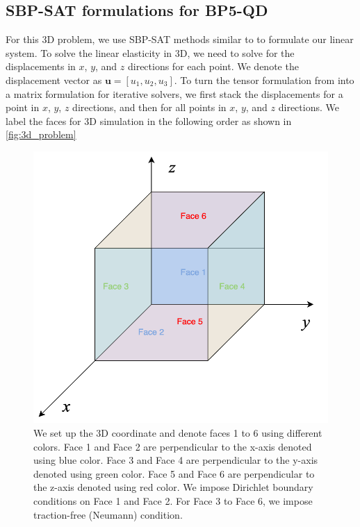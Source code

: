 \subsection{SBP-SAT formulations for BP5-QD}
For this 3D problem, we use SBP-SAT methods similar to \cite{ALMQUIST2021109842} to formulate our linear system.
To solve the linear elasticity in 3D, we need to solve for the displacements in $x$, $y$, and $z$ directions for each point.
We denote the displacement vector as $\boldsymbol{u} = [u_1, u_2, u_3]$.
To turn the tensor formulation from \cite{ALMQUIST2021109842} into a matrix formulation for iterative solvers,  we first stack the displacements for a point in $x$, $y$, $z$ directions, and then for all points in $x$, $y$, and $z$ directions.
We label the faces for 3D simulation in the following order as shown in \autoref{fig:3d_problem}

\begin{figure}
    \centering
    \includegraphics[width=\linewidth]{figures/3D_problem.png}
    \caption{We set up the 3D coordinate and denote faces 1 to 6 using different colors. Face 1 and Face 2 are perpendicular to the x-axis denoted using blue color. Face 3 and Face 4 are perpendicular to the y-axis denoted using green color. Face 5 and Face 6 are perpendicular to the z-axis denoted using red color. We impose Dirichlet boundary conditions on Face 1 and Face 2. For Face 3 to Face 6, we impose traction-free (Neumann) condition.} 
    \label{fig:3d_problem}
\end{figure}


